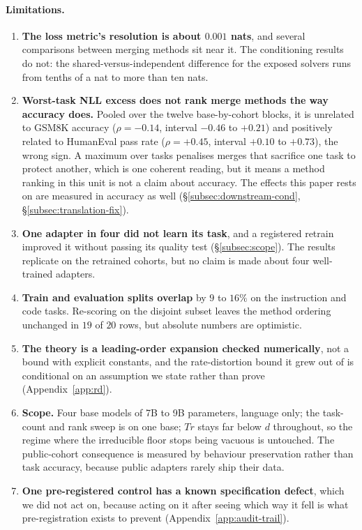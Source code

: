 \paragraph{Limitations.}
\begin{enumerate}
\item \textbf{The loss metric's resolution is about $0.001$ nats}, and several
  comparisons between merging methods sit near it. The conditioning results do
  not: the shared-versus-independent difference for the exposed solvers runs
  from tenths of a nat to more than ten nats.
\item \textbf{Worst-task NLL excess does not rank merge methods the way
  accuracy does.} Pooled over the twelve base-by-cohort blocks, it is
  unrelated to GSM8K accuracy ($\rho = -0.14$, interval $-0.46$ to $+0.21$)
  and positively related to HumanEval pass rate ($\rho = +0.45$, interval
  $+0.10$ to $+0.73$), the wrong sign. A maximum over tasks penalises merges
  that sacrifice one task to protect another, which is one coherent reading,
  but it means a method ranking in this unit is not a claim about accuracy.
  The effects this paper rests on are measured in accuracy as well
  (\S\ref{subsec:downstream-cond}, \S\ref{subsec:translation-fix}).
\item \textbf{One adapter in four did not learn its task}, and a registered
  retrain improved it without passing its quality test
  (\S\ref{subsec:scope}). The results replicate on the retrained cohorts, but
  no claim is made about four well-trained adapters.
\item \textbf{Train and evaluation splits overlap} by $9$ to $16\%$ on the
  instruction and code tasks. Re-scoring on the disjoint subset leaves the
  method ordering unchanged in $19$ of $20$ rows, but absolute numbers are
  optimistic.
\item \textbf{The theory is a leading-order expansion checked numerically},
  not a bound with explicit constants, and the rate-distortion bound it grew
  out of is conditional on an assumption we state rather than prove
  (Appendix~\ref{app:rd}).
\item \textbf{Scope.} Four base models of 7B to 9B parameters, language only;
  the task-count and rank sweep is on one base; $Tr$ stays far below $d$
  throughout, so the regime where the irreducible floor stops being vacuous is
  untouched. The public-cohort consequence is measured by behaviour
  preservation rather than task accuracy, because public adapters rarely ship
  their data.
\item \textbf{One pre-registered control has a known specification defect},
  which we did not act on, because acting on it after seeing which way it fell
  is what pre-registration exists to prevent (Appendix~\ref{app:audit-trail}).
\end{enumerate}

